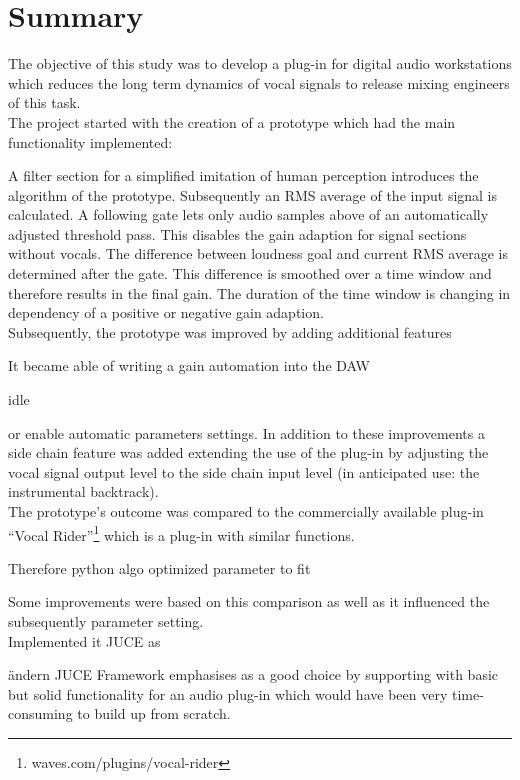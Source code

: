 \chapter{Summary}
\label{chapter:summary}

The objective of this study was to develop a plug-in for digital audio workstations which reduces the long term dynamics of vocal signals to release mixing engineers of this task.\\
The project started with the creation of a prototype which had the main functionality implemented:

A filter section for a simplified imitation of human perception introduces the algorithm of the prototype. Subsequently an RMS average of the input signal is calculated. A following gate lets only audio samples above of an automatically adjusted threshold pass. This disables the gain adaption for signal sections without vocals. The difference between loudness goal and current RMS average is determined after the gate. This difference is smoothed over a time window and therefore results in the final gain. The duration of the time window is changing in dependency of a positive or negative gain adaption.\\

Subsequently, the prototype was improved by adding additional features

It became able of writing a gain automation into the DAW

idle

 or enable automatic parameters settings. In addition to these improvements a side chain feature was added extending the use of the plug-in by adjusting the vocal signal output level to the side chain input level (in anticipated use: the instrumental backtrack).\\


The prototype's outcome was compared to the commercially available plug-in “Vocal Rider”\footnote{waves.com/plugins/vocal-rider} which is a plug-in with similar functions.

Therefore python  algo optimized parameter to fit

Some improvements were based on this comparison as well as it influenced the subsequently parameter setting.\\

Implemented it JUCE as 

ändern
JUCE Framework emphasises as a good choice by supporting with basic but solid functionality for an audio plug-in which would have been very time-consuming to build up from scratch.

